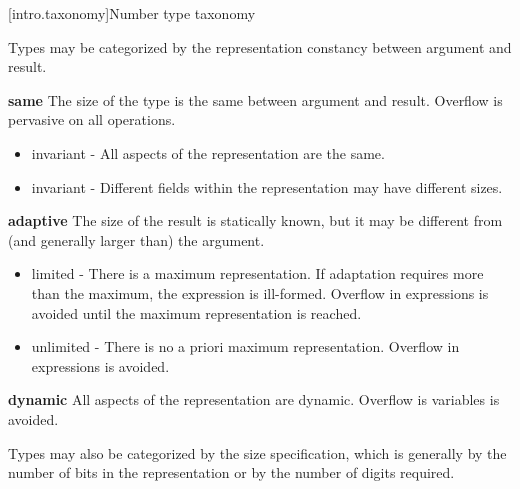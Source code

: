 [intro.taxonomy]{Number type taxonomy}

Types may be categorized by the representation constancy between argument and result.

\textbf{same}
The size of the type is the same between argument and result. Overflow is pervasive on all operations.
\begin{itemize}
\item invariant - All aspects of the representation are the same.
\item invariant - Different fields within the representation may have different sizes.
\end{itemize}
\textbf{adaptive}
The size of the result is statically known, but it may be different from (and generally larger than) the argument.
\begin{itemize}
\item limited - There is a maximum representation. If adaptation requires more than the maximum, the expression is ill-formed. Overflow in expressions is avoided until the maximum representation is reached.
\item unlimited - There is no a priori maximum representation. Overflow in expressions is avoided.
\end{itemize}
\textbf{dynamic}
All aspects of the representation are dynamic. Overflow is variables is avoided.

Types may also be categorized by the size specification, which is generally by the number of bits in the representation or by the number of digits required.

